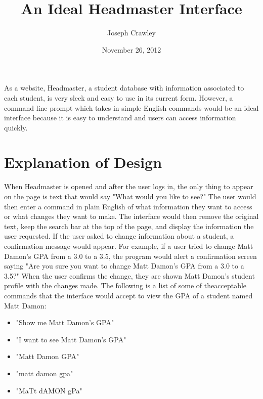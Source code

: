 \documentclass{article}
\title{An Ideal Headmaster Interface}
\author{Joseph Crawley}
\date{November 26, 2012}
\begin{document}
\maketitle

\abstract{}
As a website, Headmaster, a student database with information associated to each student, is very sleek and easy to use in its current form. However, a command line prompt which takes in simple English commands would be an ideal interface because it is easy to understand and users can access information quickly.

\pagebreak
\tableofcontents





\pagebreak

%
%
\section{Explanation of Design}
\label{introduction}

When Headmaster is opened and after the user logs in, the only thing to appear on the page is text that would say "What would you like to see?" The user would then enter a command in plain English of what information they want to access or what changes they want to make. The interface would then remove the original text, keep the search bar at the top of the page, and display the information the user requested. If the user asked to change information about a student, a confirmation message would appear. For example, if a user tried to change Matt Damon's GPA from a 3.0 to a 3.5, the program would alert a confirmation screen saying "Are you sure you want to change Matt Damon's GPA from a 3.0 to a 3.5?" When the user confirms the change, they are shown Matt Damon's student profile with the changes made. The following is a list of some of theacceptable commands that the interface would accept to view the GPA of a student named Matt Damon:
\begin{itemize}
\item "Show me Matt Damon's GPA"
\item "I want to see Matt Damon's GPA"
\item "Matt Damon GPA"
\item "matt damon gpa"
\item "MaTt dAMON gPa"
\end{itemize}
\end{document}
